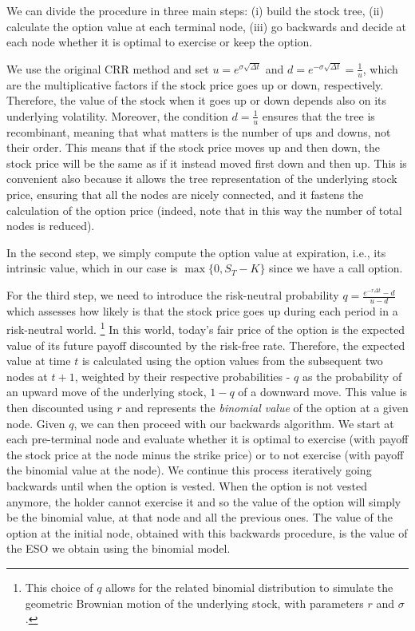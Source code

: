
We can divide the procedure in three main steps: (i) build the stock tree, (ii) calculate the option value at each terminal node, (iii) go backwards and decide at each node whether it is optimal to exercise or keep the option.

We use the original CRR method and set $u = e^{\sigma \sqrt{\Delta t}}$ and $d = e^{-\sigma \sqrt{\Delta t}}=\frac{1}{u}$, which are the multiplicative factors if the stock price goes up or down, respectively. Therefore, the value of the stock when it goes up or down depends also on its underlying volatility. Moreover, the condition $d = \frac{1}{u}$ ensures that the tree is recombinant, meaning that what matters is the number of ups and downs, not their order. This means that if the stock price moves up and then down, the stock price will be the same as if it instead moved first down and then up. This is convenient also because it allows the tree representation of the underlying stock price, ensuring that all the nodes are nicely connected, and it fastens the calculation of the option price (indeed, note that in this way the number of total nodes is reduced). 

In the second step, we simply compute the option value at expiration, i.e., its intrinsic value, which in our case is $\max \{0, S_T - K \}$ since we have a call option.

For the third step, we need to introduce the risk-neutral probability $q = \frac{e^{-r \Delta t} - d}{u-d}$ which assesses how likely is that the stock price goes up during each period in a risk-neutral world. \footnote{This choice of $q$ allows for the related binomial distribution to simulate the geometric Brownian motion of the underlying stock, with parameters $r$ and $\sigma$.} In this world, today's fair price of the option is the expected value of its future payoff discounted by the risk-free rate. Therefore, the expected value at time $t$ is calculated using the option values from the subsequent two nodes at $t+1$, weighted by their respective probabilities - $q$ as the probability of an upward move of the underlying stock, $1-q$ of a downward move. This value is then discounted using $r$ and represents the \textit{binomial value} of the option at a given node. 
Given $q$, we can then proceed with our backwards algorithm. We start at each pre-terminal node and evaluate whether it is optimal to exercise (with payoff the stock price at the node minus the strike price) or to not exercise (with payoff the binomial value at the node). We continue this process iteratively going backwards until when the option is vested. When the option is not vested anymore, the holder cannot exercise it and so the value of the option will simply be the binomial value, at that node and all the previous ones.
The value of the option at the initial node, obtained with this backwards procedure, is the value of the ESO we obtain using the binomial model.

